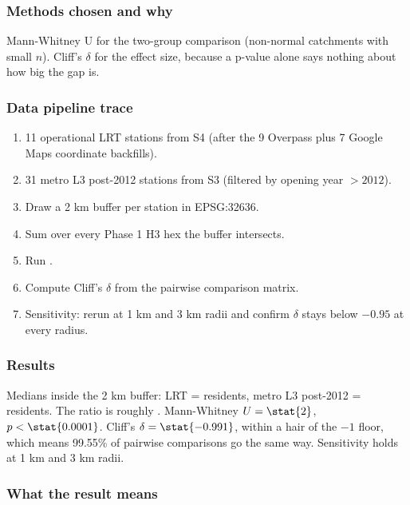 \subsubsection{Methods chosen and why}

Mann-Whitney U for the two-group comparison (non-normal catchments
with small $n$). Cliff's $\delta$ for the effect size, because a
p-value alone says nothing about how big the gap is.

\subsubsection{Data pipeline trace}

\begin{enumerate}
 \item 11 operational LRT stations from S4 (after the 9 Overpass
 plus 7 Google Maps coordinate backfills).
 \item 31 metro L3 post-2012 stations from S3 (filtered by opening
 year $> 2012$).
 \item Draw a 2 km buffer per station in EPSG:32636.
 \item Sum  over every Phase 1 H3 hex the
 buffer intersects.
 \item Run .
 \item Compute Cliff's $\delta$ from the pairwise comparison matrix.
 \item Sensitivity: rerun at 1 km and 3 km radii and confirm
 $\delta$ stays below $-0.95$ at every radius.
\end{enumerate}

\subsubsection{Results}

Medians inside the 2 km buffer: LRT =  residents, metro L3
post-2012 =  residents. The ratio is roughly
. Mann-Whitney $U = \stat{2}$, $p < \stat{0.0001}$.
Cliff's $\delta = \stat{-0.991}$, within a hair of the $-1$ floor,
which means 99.55\% of pairwise comparisons go the same way.
Sensitivity holds at 1 km and 3 km radii.


\subsubsection{What the result means}

